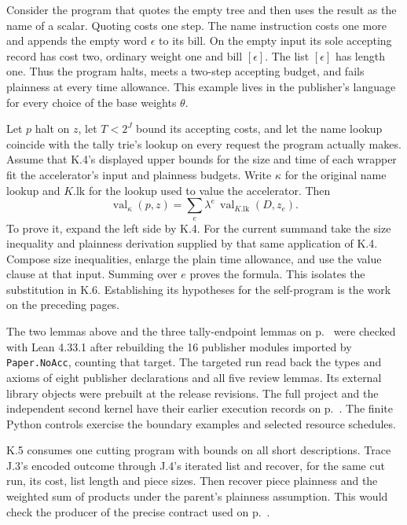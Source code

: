 \clearpage
{}\label{sec:15evidence}

Consider the program that quotes the empty tree and then uses the result as the name of a scalar. Quoting costs one step. The name instruction costs one more and appends the empty word $\epsilon$ to its bill. On the empty input its sole accepting record has cost two, ordinary weight one and bill $[\epsilon]$. The list $[\epsilon]$ has length one. Thus the program halts, meets a two-step accepting budget, and fails plainness at every time allowance. This example lives in the publisher's language for every choice of the base weights $\theta$.

Let $p$ halt on $z$, let $T<2^J$ bound its accepting costs, and let the name lookup coincide with the tally trie's lookup on every request the program actually makes. Assume that K.4's displayed upper bounds for the size and time of each wrapper fit the accelerator's input and plainness budgets. Write $\kappa$ for the original name lookup and $K.\mathrm{lk}$ for the lookup used to value the accelerator. Then
\[
 \operatorname{val}_{\kappa}(p,z)
  =\sum_e\lambda^e\,\operatorname{val}_{K.\mathrm{lk}}(D,z_e).
\]
To prove it, expand the left side by K.4. For the current summand take the size inequality and plainness derivation supplied by that same application of K.4. Compose size inequalities, enlarge the plain time allowance, and use the value clause at that input. Summing over $e$ proves the formula. This isolates the substitution in K.6. Establishing its hypotheses for the self-program is the work on the preceding pages.

The two lemmas above and the three tally-endpoint lemmas on p.~\pageref{sec:15endpoint} were checked with Lean 4.33.1 after rebuilding the 16 publisher modules imported by \texttt{Paper.NoAcc}, counting that target. The targeted run read back the types and axioms of eight publisher declarations and all five review lemmas. Its external library objects were prebuilt at the release revisions. The full project and the independent second kernel have their earlier execution records on p.~\pageref{sec:14formal}. The finite Python controls exercise the boundary examples and selected resource schedules.

K.5 consumes one cutting program with bounds on all short descriptions. Trace J.3's encoded outcome through J.4's iterated list and recover, for the same cut run, its cost, list length and piece sizes. Then recover piece plainness and the weighted sum of products under the parent's plainness assumption. This would check the producer of the precise contract used on p.~\pageref{sec:15k5}.

